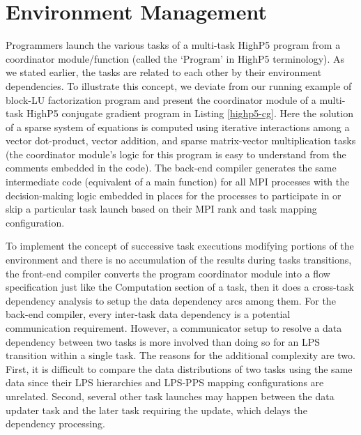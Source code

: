 \documentclass[ASNA,twocolumn]{USG} %
\begin{document}
{\section{Environment Management}
\label{sec:env-mgmt}
Programmers launch the various tasks of a multi-task HighP5 program from a coordinator module/function (called the `Program' in HighP5 terminology). As we stated earlier, the tasks are related to each other by their environment dependencies. To illustrate this concept, we deviate from our running example of block-LU factorization program and present the coordinator module of a multi-task HighP5 conjugate gradient program in Listing \ref{highp5-cg}. Here the solution of a sparse system of equations is computed using iterative interactions among a vector dot-product, vector addition, and sparse matrix-vector multiplication tasks (the coordinator module's logic for this program is easy to understand from the comments embedded in the code). The back-end compiler generates the same intermediate code (equivalent of a main function) for all MPI processes with the decision-making logic embedded in places for the processes to participate in or skip a particular task launch based on their MPI rank and task mapping configuration.   

To implement the concept of successive task executions modifying portions of the environment and there is no accumulation of the results during tasks transitions, the front-end compiler converts the program coordinator module into a flow specification just like the Computation section of a task, then it does a cross-task dependency analysis to setup the data dependency arcs among them. For the back-end compiler, every inter-task data dependency is a potential communication requirement. However, a communicator setup to resolve a data dependency between two tasks is more involved than doing so for an LPS transition within a single task. The reasons for the additional complexity are two. First, it is difficult to compare the data distributions of two tasks using the same data since their LPS hierarchies and LPS-PPS mapping configurations are unrelated. Second, several other task launches may happen between the data updater task and the later task requiring the update, which delays the dependency processing.

}
\end{document}
